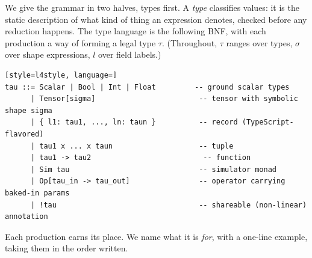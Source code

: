 We give the grammar in two halves, types first. A \emph{type} classifies values:
it is the static description of what kind of thing an expression denotes, checked
before any reduction happens. The type language is the following BNF, with each
production a way of forming a legal type $\tau$. (Throughout, $\tau$ ranges over
types, $\sigma$ over shape expressions, $l$ over field labels.)

\begin{lstlisting}[style=l4style, language=]
tau ::= Scalar | Bool | Int | Float         -- ground scalar types
      | Tensor[sigma]                        -- tensor with symbolic shape sigma
      | { l1: tau1, ..., ln: taun }          -- record (TypeScript-flavored)
      | tau1 x ... x taun                    -- tuple
      | tau1 -> tau2                          -- function
      | Sim tau                              -- simulator monad
      | Op[tau_in -> tau_out]                -- operator carrying baked-in params
      | !tau                                 -- shareable (non-linear) annotation
\end{lstlisting}

\noindent Each production earns its place. We name what it is \emph{for}, with a
one-line example, taking them in the order written.

